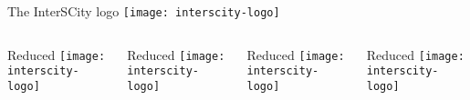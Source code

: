 \begin{frame}[fragile]\centering

\begin{columns}[T]

  \singlecol

  \begin{block}{The InterSCity logo}
      \centering
      \texttt{[image: interscity-logo]}
  \end{block}

\end{columns}

\vspace*{.5\baselineskip}

\begin{columns}[T]

  \onefourthcol

  \begin{block}{Reduced}
        \centering
        \texttt{[image: interscity-logo]}
  \end{block}

  \onefourthcol

  \begin{block}{Reduced}
        \centering
        \texttt{[image: interscity-logo]}
  \end{block}

  \onefourthcol

  \begin{block}{Reduced}
        \centering
        \texttt{[image: interscity-logo]}
  \end{block}

  \onefourthcol

  \begin{block}{Reduced}
        \centering
        \texttt{[image: interscity-logo]}
  \end{block}

\end{columns}

\vspace*{.5\baselineskip}

\begin{columns}[T]

  \halfcol


\end{columns}
\end{frame}
